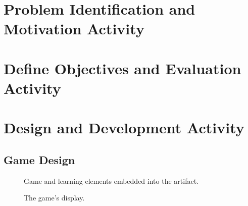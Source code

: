 \documentclass[runningheads,a4paper]{llncs}
\begin{document}
\section{Problem Identification and Motivation Activity}

\section{Define Objectives and Evaluation Activity}

\section{Design and Development Activity}

\subsection{Game Design}

\begin{figure}[htb]
\centering
{}
\hspace*{\fill}
\caption{Game and learning elements embedded into the artifact.}
\end{figure}

\begin{figure}[htb]
\centering
{}
\caption{The game's display.}
\end{figure}
\end{document}
